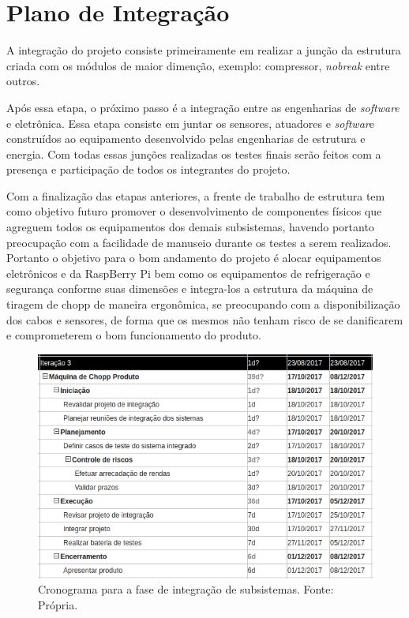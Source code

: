 \chapter[Plano de Integração]{Plano de Integração}
A integração do projeto consiste primeiramente em realizar a junção da estrutura
 criada com os módulos de maior dimenção, exemplo: compressor, \textit{nobreak}
 entre outros.

Após essa etapa, o próximo passo é a integração entre as
 engenharias de \textit{software} e eletrônica. Essa 
 etapa consiste em juntar os sensores, atuadores e \textit{softwar}e construídos ao
 equipamento desenvolvido pelas engenharias de  estrutura e energia.
 Com todas essas junções realizadas os testes finais serão feitos com
 a presença e participação de todos os integrantes do projeto.

Com a finalização das etapas anteriores, a frente de trabalho de estrutura
tem como objetivo futuro promover o desenvolvimento de componentes físicos que agreguem
todos os equipamentos dos demais subsistemas, havendo portanto preocupação com a facilidade
de manuseio durante os testes a serem realizados. Portanto o objetivo para o bom andamento do projeto é
alocar equipamentos eletrônicos e da RaspBerry Pi bem como os equipamentos de refrigeração
e segurança conforme suas dimensões e integra-los a estrutura da
máquina de tiragem de chopp de maneira ergonômica, se preocupando com a disponibilização dos cabos
e sensores, de forma que os mesmos não tenham risco de se danificarem e comprometerem o
bom funcionamento do produto.

\begin{figure}[!htb]
    \centering
    \includegraphics[scale= 0.7]{figuras/cronograma.png}
    \caption{Cronograma para a fase de integração de subsistemas. Fonte: Própria.}
    \label{cronograma}
\end{figure}
